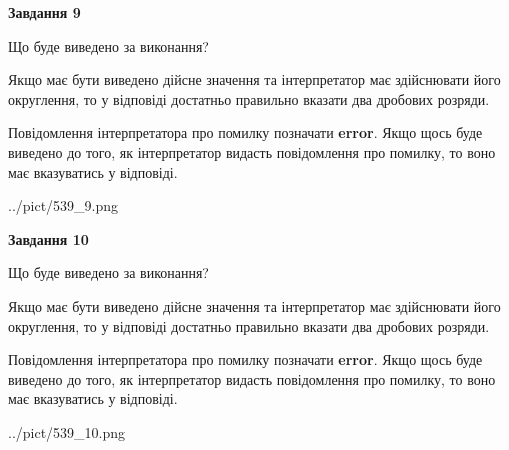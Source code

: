 \documentclass[12pt, ukrainian]{article}
\begin{document}
{\begin {Large}
{\begin {center}\textbf{Завдання 9}\end {center}}\par
Що буде виведено за виконання? \par

Якщо має бути виведено дійсне значення та інтерпретатор має здійснювати його округлення, 
то у відповіді достатньо правильно вказати два дробових розряди.

Повідомлення інтерпретатора про помилку позначати \textbf{error}.
Якщо щось буде виведено до того, як інтерпретатор видасть повідомлення про помилку, 
то воно має вказуватись у відповіді. \par

\begin{center}
	{../pict/539_9.png}
\end{center}
\newpage

{\begin {center}\textbf{Завдання 10}\end {center}}\par
Що буде виведено за виконання? \par

Якщо має бути виведено дійсне значення та інтерпретатор має здійснювати його округлення, 
то у відповіді достатньо правильно вказати два дробових розряди.

Повідомлення інтерпретатора про помилку позначати \textbf{error}.
Якщо щось буде виведено до того, як інтерпретатор видасть повідомлення про помилку, 
то воно має вказуватись у відповіді. \par

\begin{center}
	{../pict/539_10.png}
\end{center}
\newpage

\end {Large}}
\end{document}
